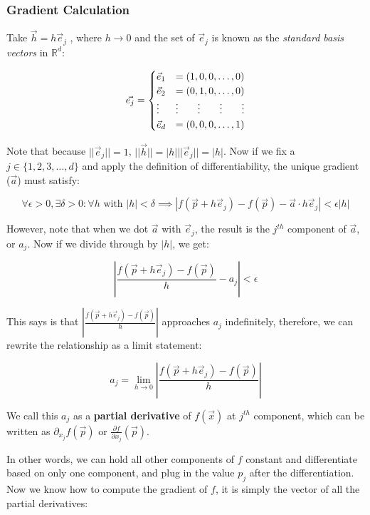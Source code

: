 \documentclass[11 pt, twoside]{article}
\begin{document}
\subsubsection{Gradient Calculation}

Take $\vec{h} = h\vec{e}_j$ , where $h\to 0$ and the set of $\vec{e}_j$ is known
as the \textit{standard basis vectors} in $\mathbb{R}^d$:

\begin{equation*}
\vec{e_j}=
\begin{cases}
\vec{e}_1 &= (1,0,0,\dots,0)\\
\vec{e}_2 &= (0,1,0,\dots,0)\\
\vdots & \vdots \hfill \vdots \hfill \vdots \hfill \vdots\\
\vec{e}_d &= (0,0,0,\dots,1)\\
\end{cases}
\end{equation*}

Note that because $||\vec{e}_j|| = 1$, $||\vec{h}|| = |h|||\vec{e}_j|| = |h|$. Now if we fix a $j \in \{1,2,3,\dots,d\}$ and apply the definition of differentiability, the unique gradient ($\vec{a}$) must satisfy:

$$\forall \epsilon > 0, \exists \delta > 0: \forall h \text{ with } |h| < \delta \implies |f(\vec{p} + h\vec{e}_j) - f(\vec{p}) - \vec{a}\cdot h\vec{e}_j| < \epsilon|h|$$

However, note that when we dot $\vec{a}$ with $\vec{e}_j$, the result is the $j^{th}$ component of $\vec{a}$, or $a_j$. Now if we divide through by $|h|$, we get:

$$\left|\frac{f(\vec{p} + h\vec{e}_j) - f(\vec{p})}{h} - a_j\right| < \epsilon$$

This says is that $\left|\frac{f(\vec{p} + h\vec{e}_j) - f(\vec{p})}{h}\right|$ approaches $a_j$ indefinitely, therefore, we can rewrite the relationship as a limit statement:

$$\boxed{a_j = \lim_{h \to 0} \left|\frac{f(\vec{p} + h\vec{e}_j) - f(\vec{p})}{h}\right|}$$

We call this $a_j$ as a \textbf{partial derivative} of $f(\vec{x})$ at $j^{th}$ component, which can be written as $\partial_{x_j} f(\vec{p})$ or $\frac{\partial f}{\partial x_j} (\vec{p})$.


In other words, we can hold all other components of $f$ constant and differentiate based on only one component, and plug in the value $p_j$ after the differentiation. Now we know how to compute the gradient of $f$, it is simply the vector of all the partial derivatives:
\end{document}
